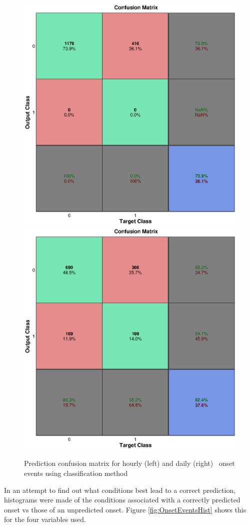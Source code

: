 \begin{figure}[htp!]
	\centering
	\includegraphics[width=0.45\linewidth]{Figures/CH5/NNBinaryOnset-hourly.eps}
	\includegraphics[width=0.45\linewidth]{Figures/CH5/NNBinaryOnset-daily.eps}
	\caption{Prediction confusion matrix for hourly (left) and daily (right) \req\ onset events using classification method}
	\label{fig:OnsetEvents}
\end{figure}

In an attempt to find out what conditions best lead to a correct prediction, histograms were made of the conditions associated with a correctly predicted onset vs those of an unpredicted onset. Figure \ref{fig:OnsetEventsHist} shows this for the four variables used.

